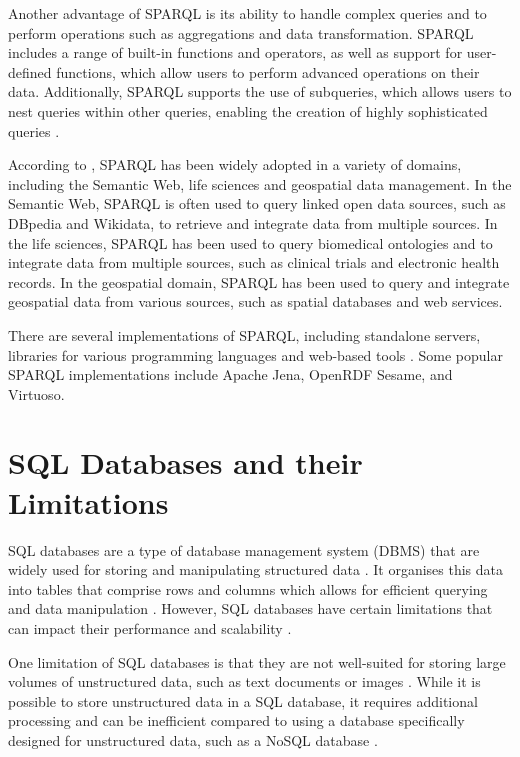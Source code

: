 Another advantage of SPARQL is its ability to handle complex queries and to perform operations such as aggregations and data transformation.  SPARQL includes a range of built-in functions and operators, as well as support for user-defined functions, which allow users to perform advanced operations on their data.  Additionally, SPARQL supports the use of subqueries, which allows users to nest queries within other queries, enabling the creation of highly sophisticated queries \citep*{allemang2011semantic}.

According to \citet*{allemang2011semantic}, SPARQL has been widely adopted in a variety of domains, including the Semantic Web, life sciences and geospatial data management.  In the Semantic Web, SPARQL is often used to query linked open data sources, such as DBpedia and Wikidata, to retrieve and integrate data from multiple sources.  In the life sciences, SPARQL has been used to query biomedical ontologies and to integrate data from multiple sources, such as clinical trials and electronic health records.  In the geospatial domain, SPARQL has been used to query and integrate geospatial data from various sources, such as spatial databases and web services.

There are several implementations of SPARQL, including standalone servers, libraries for various programming languages and web-based tools \citep*{sparql22i}.  Some popular SPARQL implementations include Apache Jena, OpenRDF Sesame, and Virtuoso.

\section{SQL Databases and their Limitations}
SQL databases are a type of database management system (DBMS) that are widely used for storing and manipulating structured data \citep*{garcia2008database}.  It organises this data into tables that comprise rows and columns which allows for efficient querying and data manipulation \citep*{ramez2016fundamentals}.  However, SQL databases have certain limitations that can impact their performance and scalability \citep*{chen2014data}.

One limitation of SQL databases is that they are not well-suited for storing large volumes of unstructured data, such as text documents or images \citep*{chen2014data}.  While it is possible to store unstructured data in a SQL database, it requires additional processing and can be inefficient compared to using a database specifically designed for unstructured data, such as a NoSQL database \citep*{kleppmann2019designing}.

